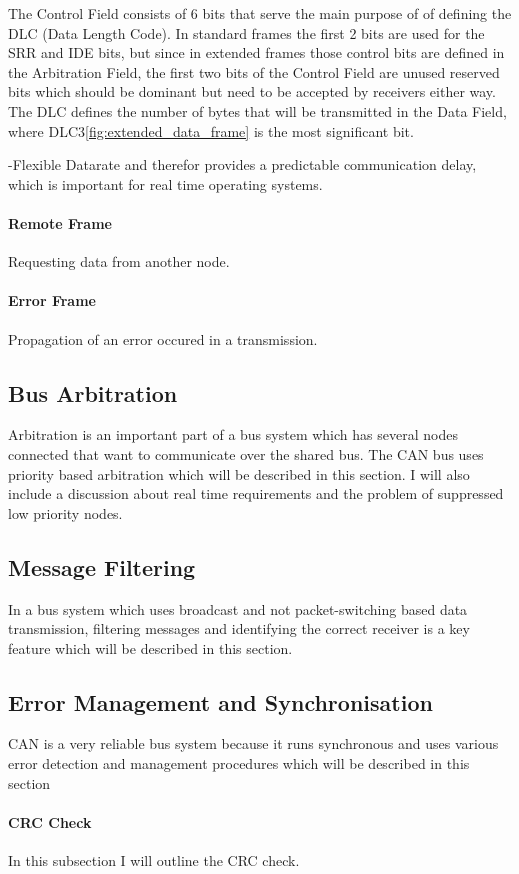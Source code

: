 	The Control Field consists of 6 bits that serve the main purpose of of defining
	the DLC (Data Length Code). In standard frames the first 2 bits are used for
	the SRR and IDE bits, but since in extended frames those control bits are
	defined in the Arbitration Field, the first two bits of the Control Field are
	unused reserved bits which should be dominant but need to be accepted by
	receivers either way. The DLC defines the number of bytes that will be
	transmitted in the Data Field, where DLC3\autoref{fig:extended_data_frame} is
	the most significant bit.
	
	-Flexible Datarate
	 and therefor
	provides a predictable communication delay, which is important for real time
	operating systems.
	\paragraph{Remote Frame}
Requesting data from another node.
	\paragraph{Error Frame}
Propagation of an error occured in a transmission.
\subsection{Bus Arbitration}
Arbitration is an important part of a bus system which has several nodes
connected that want to communicate over the shared bus. The CAN bus uses
priority based arbitration which will be described in this section. I will also
include a discussion about real time requirements and the problem of suppressed
low priority nodes.
\subsection{Message Filtering}
In a bus system which uses broadcast and not packet-switching based data
transmission, filtering messages and identifying the correct receiver is a key
feature which will be described in this section.
\subsection{Error Management and Synchronisation}
CAN is a very reliable bus system because it runs synchronous and uses various
error detection and management procedures which will be described in this
section
	\paragraph{CRC Check}
In this subsection I will outline the CRC check.
